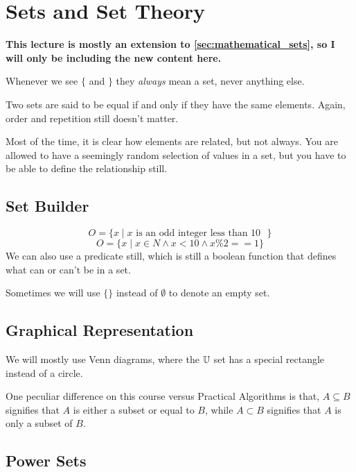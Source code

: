 \section{Sets and Set Theory}\label{sec:sets_and_set_theory}

\begin{note}
    \textbf{This lecture is mostly an extension to \cref{sec:mathematical_sets}, so I will only be including the new content here.}
\end{note}
Whenever we see \(\{\) and \(\}\) they \emph{always} mean a set, never anything else.

Two sets are said to be equal if and only if they have the same elements.
Again, order and repetition still doesn't matter.

Most of the time, it is clear how elements are related, but not always.
You are allowed to have a seemingly random selection of values in a set, but you have to be able to define the relationship still.

\subsection{Set Builder}\label{sub:set_builderdsrsix}

\[
    O=\{x  \mid x \text{ is an odd integer less than \(10\) } \}
\]
\[
    O = \{ x  \mid x \in  N \land x < 10 \land x \% 2 == 1 \}
\]
We can also use a predicate still, which is still a boolean function that defines what can or can't be in a set.

\begin{note}
    Sometimes we will use \(\{\}\) instead of \(\emptyset\) to denote an empty set.
\end{note}

\subsection{Graphical Representation}\label{sub:graphical_representation}

We will mostly use Venn diagrams, where the \(\mathbb{U}\) set has a special rectangle instead of a circle.

\begin{note}
    One peculiar difference on this course versus Practical Algorithms is that, \(A \subseteq B\) signifies that \(A\) is either a subset or equal to \(B\), while \(A \subset B\) signifies that \(A\) is only a subset of \(B\).
\end{note}

\subsection{Power Sets}\label{sub:power_sets}

